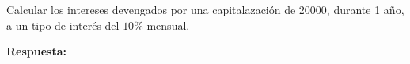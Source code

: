 \documentclass[12pt]{examdesign}
\theoremstyle{plain}
\theoremstyle{definition}
\theoremstyle{remark}
\begin{document}
\begin{shortanswer}[title={Leemos el material de consulta y realizamos las actividades propuestas.}, rearrange=no]
\begin{question}
\begin{answer}
        	\end{answer}
        \end{question}
    
        \begin{question}
        	Calcular los intereses devengados por una capitalazación de $20000$, durante 1 año, a un tipo de interés del $10\%$ mensual.
        	\begin{answer}
        		\textbf{Respuesta:}
        		
        	\end{answer}
        \end{question}
    \end{shortanswer}
\end{document}
